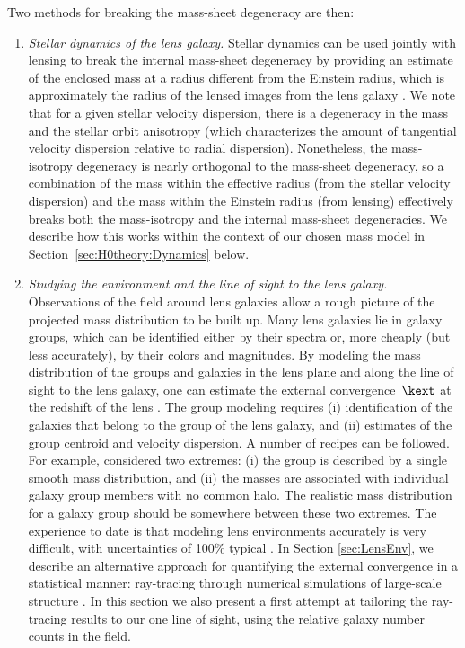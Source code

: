 \documentclass[useAMS,usenatbib]{mn2e}
\begin{document}
Two methods for breaking the mass-sheet degeneracy are then: 
\renewcommand{\theenumi}{\roman{enumi}}
\begin{enumerate}
\item \textit{Stellar dynamics of the lens galaxy.}  Stellar dynamics
  can be used jointly with lensing to break the internal mass-sheet degeneracy
  by providing an estimate of the enclosed mass at a radius different
  from the Einstein radius, which is approximately the radius of the
  lensed images from the lens galaxy
  \citep[e.g.,][]{GroginNarayan96a, GroginNarayan96b, TonryFranx99,
    KoopmansTreu02, TreuKoopmans02, BarnabeKoopmans07}.  We note that
  for a given stellar velocity dispersion, there is a degeneracy in
  the mass and the stellar orbit anisotropy (which characterizes the amount of
  tangential velocity dispersion relative to radial dispersion).  Nonetheless,
  the mass-isotropy degeneracy is nearly orthogonal to the mass-sheet
  degeneracy, so a combination of the mass within the effective radius
  (from the stellar velocity dispersion) and the mass within the Einstein
  radius (from lensing) effectively breaks both the mass-isotropy and
  the internal mass-sheet degeneracies. We describe how this works within the
  context of our chosen mass model in Section~\ref{sec:H0theory:Dynamics}
  below.
\item \textit{Studying the environment and the line of sight to the lens galaxy.}  
  Observations of the field around lens galaxies allow a rough picture of the
  projected mass distribution to be built up. Many lens galaxies lie in galaxy
  groups, which can be identified either by their spectra or, more cheaply
  (but less accurately), by their colors and magnitudes.    By modeling the
  mass distribution of the groups and galaxies in the lens plane and along the
  line of sight  to the lens galaxy, one can estimate the external
  convergence~$\kext$  at the redshift of the lens \citep[e.g.][and references
  therein]{MomchevaEtal06, FassnachtEtal06, AugerEtal07}.  The group modeling
  requires (i) identification of the  galaxies that belong to the group of the
  lens galaxy, and (ii) estimates of the group centroid and velocity
  dispersion.  A number of recipes can be followed. For example,
  \citet{KeetonZabludoff04} considered two extremes: (i) the group is
  described by a single smooth mass distribution, and (ii) the masses are
  associated with individual galaxy group members with no common halo.  The
  realistic mass distribution for a galaxy group should be somewhere between
  these two extremes.  
  The experience to date  is that 
  modeling lens environments accurately is very difficult, with uncertainties
  of 100\% typical \citep[e.g.][]{MomchevaEtal06, FassnachtEtal06}.    
  In Section \ref{sec:LensEnv}, we describe an
  alternative approach for quantifying the external convergence in a
  statistical manner: ray-tracing through numerical simulations of large-scale
  structure \citep{HilbertEtal07}.
  In this section 
  we also present a first attempt at tailoring the ray-tracing results 
  to our one line of sight, using the relative galaxy number counts in the
  field.
\end{enumerate}
\end{document}
